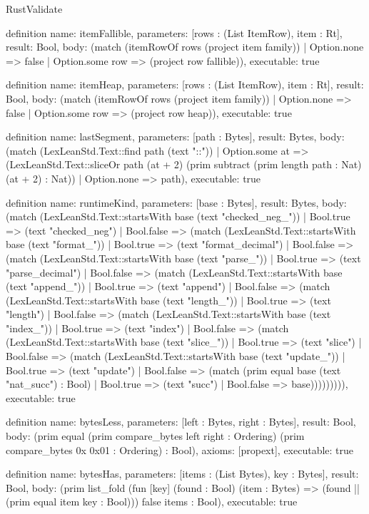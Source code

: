 \begin{lexlean}{RustValidate}
\begin{semanticmodule}
definition{
  name: itemFallible,
  parameters: [rows : (List ItemRow), item : Rt],
  result: Bool,
  body: (match (itemRowOf rows (project item family))
    | Option.none => false
    | Option.some row => (project row fallible)),
  executable: true
}

definition{
  name: itemHeap,
  parameters: [rows : (List ItemRow), item : Rt],
  result: Bool,
  body: (match (itemRowOf rows (project item family))
    | Option.none => false
    | Option.some row => (project row heap)),
  executable: true
}

definition{
  name: lastSegment,
  parameters: [path : Bytes],
  result: Bytes,
  body: (match (LexLeanStd.Text::find path (text "::"))
    | Option.some at => (LexLeanStd.Text::sliceOr path (at + 2) (prim subtract (prim length path : Nat) (at + 2) : Nat))
    | Option.none => path),
  executable: true
}

definition{
  name: runtimeKind,
  parameters: [base : Bytes],
  result: Bytes,
  body: (match (LexLeanStd.Text::startsWith base (text "checked_neg_"))
    | Bool.true => (text "checked_neg")
    | Bool.false => (match (LexLeanStd.Text::startsWith base (text "format_"))
      | Bool.true => (text "format_decimal")
      | Bool.false => (match (LexLeanStd.Text::startsWith base (text "parse_"))
        | Bool.true => (text "parse_decimal")
        | Bool.false => (match (LexLeanStd.Text::startsWith base (text "append_"))
          | Bool.true => (text "append")
          | Bool.false => (match (LexLeanStd.Text::startsWith base (text "length_"))
            | Bool.true => (text "length")
            | Bool.false => (match (LexLeanStd.Text::startsWith base (text "index_"))
              | Bool.true => (text "index")
              | Bool.false => (match (LexLeanStd.Text::startsWith base (text "slice_"))
                | Bool.true => (text "slice")
                | Bool.false => (match (LexLeanStd.Text::startsWith base (text "update_"))
                  | Bool.true => (text "update")
                  | Bool.false => (match (prim equal base (text "nat_succ") : Bool)
                    | Bool.true => (text "succ")
                    | Bool.false => base))))))))),
  executable: true
}

definition{
  name: bytesLess,
  parameters: [left : Bytes, right : Bytes],
  result: Bool,
  body: (prim equal (prim compare_bytes left right : Ordering) (prim compare_bytes 0x 0x01 : Ordering) : Bool),
  axioms: [propext],
  executable: true
}

definition{
  name: bytesHas,
  parameters: [items : (List Bytes), key : Bytes],
  result: Bool,
  body: (prim list_fold (fun [key] (found : Bool) (item : Bytes) => (found || (prim equal item key : Bool))) false items : Bool),
  executable: true
}


\end{semanticmodule}
\end{lexlean}

